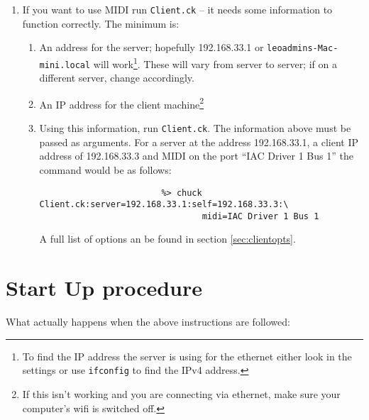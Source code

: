 \documentclass[11pt]{article}
\begin{document}
\begin{enumerate} [\bf 1.]
\begin{enumerate} [\bf i.]
\begin{enumerate} [\bf a.]
		\end{enumerate}
		\item {If you want to use MIDI run \texttt{Client.ck} -- it needs some information to function correctly.
			  The minimum is: }
		\begin{enumerate} [\bf a.]
			\item{An address for the server; hopefully 192.168.33.1 or \texttt{leoadmins-Mac-mini.local} will work\footnote{ To find the IP address the server is using for the ethernet either look in the settings or use \verb+ifconfig+
			to find the IPv4 address.}. These will vary from server to server; if on a different server, change accordingly.}
			\item{An IP address for the client machine\footnote{If this isn't working and you are connecting via ethernet, make sure your computer's wifi is switched off.}}
			\item Using this information, run \texttt{Client.ck}. The information above must be passed as arguments. For a server at the address 
				192.168.33.1, a client IP address of 192.168.33.3 and MIDI on the port ``IAC Driver 1 Bus 1'' the command would be as follows:
				\begin{verbatim}
					    %> chuck Client.ck:server=192.168.33.1:self=192.168.33.3:\
					            midi=IAC Driver 1 Bus 1
				\end{verbatim}
				A full list of options an be found in section \ref{sec:clientopts}.
		\end{enumerate}
	\end{enumerate}

\end{enumerate}

\newpage
\section{Start Up procedure}
\label{sec:startupproc}
What actually happens when the above instructions are followed:
\end{document}
